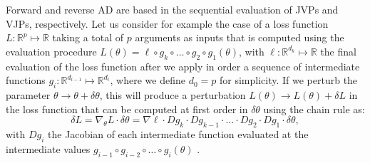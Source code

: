 
Forward and reverse AD are based in the sequential evaluation of JVPs and VJPs, respectively. 
Let us consider for example the case of a loss function $L : \mathbb R^p \mapsto \mathbb R$ taking a total of $p$ arguments as inputs that is computed using the evaluation procedure $L(\theta) = \ell \circ g_{k} \circ \ldots \circ g_2 \circ g_1(\theta)$, with $\ell : \mathbb R^{d_k} \mapsto \mathbb R$ the final evaluation of the loss function after we apply in order a sequence of intermediate functions $g_i : \mathbb R^{d_{i-1}} \mapsto \mathbb R^{d_i}$, where we define $d_0 = p$ for simplicity. 
If we perturb the parameter $\theta \rightarrow \theta + \delta \theta$, this will produce a perturbation $L (\theta) \rightarrow L(\theta) + \delta L$ in the loss function that can be computed at first order in $\delta \theta$ using the chain rule as: 
\begin{equation}
     \delta L = \nabla_\theta L \cdot \delta \theta = \nabla \ell \cdot Dg_{k} \cdot Dg_{k-1} \cdot \ldots \cdot Dg_2 \cdot Dg_1 \cdot \delta \theta , 
    \label{eq:deltaL}
\end{equation}
with $Dg_i$ the Jacobian of each intermediate function evaluated at the intermediate values $g_{i-1} \circ g_{i-2} \circ \ldots \circ g_i (\theta)$ \cite{Giering_Kaminski_1998}.

